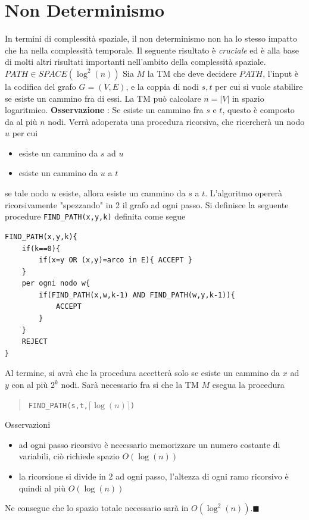 \documentclass[10pt, letterpaper]{report}
\begin{document}
\section{Non Determinismo}\label{ndetSpace}
In termini di complessità spaziale, il non determinismo non ha lo stesso impatto che ha nella complessità temporale. Il seguente risultato è \textit{cruciale} ed è alla base di molti altri risultati importanti nell'ambito della complessità spaziale.\acc 
\teo{} $PATH \in SPACE(\log^2(n))$\acc 
\dimo{} Sia $M$ la TM che deve decidere $PATH$, l'input è la codifica del grafo $G=(V,E)$, e la coppia di nodi $s,t$ per cui si vuole stabilire se esiste un cammino fra di essi. La TM può calcolare $n=|V|$ in spazio logaritmico. \acc 
\textbf{Osservazione} : Se esiste un cammino fra $s$ e $t$, questo è composto da al più $n$ nodi.\acc 
Verrà adoperata una procedura ricorsiva, che ricercherà un nodo $u$ per cui \begin{itemize}
    \item esiste un cammino da $s$ ad $u$ 
    \item esiste un cammino da $u$ a $t$
\end{itemize}
se tale nodo $u$ esiste, allora esiste un cammino da $s$ a $t$. L'algoritmo opererà ricorsivamente "spezzando" in 2 il grafo ad ogni passo. \acc 
Si definisce la seguente procedure \texttt{FIND\_PATH(x,y,k)} definita come segue 
\begin{lstlisting}
FIND_PATH(x,y,k){
    if(k==0){
        if(x=y OR (x,y)=arco in E){ ACCEPT }
    }
    per ogni nodo w{
        if(FIND_PATH(x,w,k-1) AND FIND_PATH(w,y,k-1)){
            ACCEPT
        }
    }
    REJECT 
}
\end{lstlisting}
Al termine, si avrà che la procedura accetterà solo se esiste un cammino da $x$ ad $y$ con al più $2^k$ nodi. Sarà necessario fra si che la TM $M$ esegua la procedura \begin{quote}
    \texttt{FIND\_PATH(s,t,$\lceil \log(n)\rceil $)}
\end{quote}
Osservazioni\begin{itemize}
    \item ad ogni passo ricorsivo è necessario memorizzare un numero costante di variabili, ciò richiede spazio $O(\log(n))$
    \item la ricorsione si divide in 2 ad ogni passo, l'altezza di ogni ramo ricorsivo è quindi al più $O(\log(n))$
\end{itemize}
Ne consegue che lo spazio totale necessario sarà in $O(\log^2(n))$.\hfill$\blacksquare$\acc  
\end{document}

